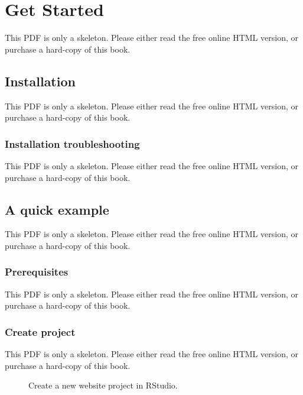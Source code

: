 \documentclass[
  12pt,
]{krantz}
\begin{document}
\mainmatter
\chapter{Get Started}\label{get-started}

This PDF is only a skeleton. Please either read the free online HTML version, or purchase a hard-copy of this book.

\section{Installation}\label{installation}

This PDF is only a skeleton. Please either read the free online HTML version, or purchase a hard-copy of this book.

\subsection{Installation troubleshooting}\label{installation-troubleshooting}

This PDF is only a skeleton. Please either read the free online HTML version, or purchase a hard-copy of this book.

\section{A quick example}\label{a-quick-example}

This PDF is only a skeleton. Please either read the free online HTML version, or purchase a hard-copy of this book.

\subsection{Prerequisites}\label{prerequisites}

This PDF is only a skeleton. Please either read the free online HTML version, or purchase a hard-copy of this book.

\subsection{Create project}\label{create-project}

This PDF is only a skeleton. Please either read the free online HTML version, or purchase a hard-copy of this book.

\begin{figure}\caption{Create a new website project in RStudio.}\end{figure}
\end{document}
